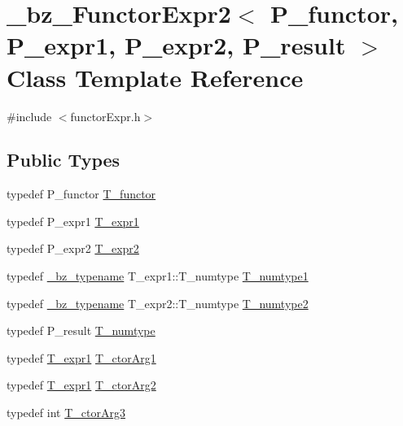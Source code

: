 \hypertarget{class__bz__FunctorExpr2}{}\section{\+\_\+bz\+\_\+\+Functor\+Expr2$<$ P\+\_\+functor, P\+\_\+expr1, P\+\_\+expr2, P\+\_\+result $>$ Class Template Reference}
\label{class__bz__FunctorExpr2}


{\ttfamily \#include $<$functor\+Expr.\+h$>$}

\subsection*{Public Types}
\begin{DoxyCompactItemize}
\item 
typedef P\+\_\+functor \hyperlink{class__bz__FunctorExpr2_a3fe23ec6c06a2346710d4590986bc1ae}{T\+\_\+functor}
\item 
typedef P\+\_\+expr1 \hyperlink{class__bz__FunctorExpr2_ab18a816b647c4ec928bdd1b61646abfd}{T\+\_\+expr1}
\item 
typedef P\+\_\+expr2 \hyperlink{class__bz__FunctorExpr2_af1371d32263c82261e4b24f3229af6ee}{T\+\_\+expr2}
\item 
typedef \hyperlink{compiler_8h_a1bc40add3e72effc9cf69dbe445cbdfd}{\+\_\+bz\+\_\+typename} T\+\_\+expr1\+::\+T\+\_\+numtype \hyperlink{class__bz__FunctorExpr2_ae7900fdd57163e00202ee2534db102f9}{T\+\_\+numtype1}
\item 
typedef \hyperlink{compiler_8h_a1bc40add3e72effc9cf69dbe445cbdfd}{\+\_\+bz\+\_\+typename} T\+\_\+expr2\+::\+T\+\_\+numtype \hyperlink{class__bz__FunctorExpr2_aa8c2406a5dba0757ad6c0de0c95ab026}{T\+\_\+numtype2}
\item 
typedef P\+\_\+result \hyperlink{class__bz__FunctorExpr2_a72c49dc29bb54d045667666e72ea96a6}{T\+\_\+numtype}
\item 
typedef \hyperlink{class__bz__FunctorExpr2_ab18a816b647c4ec928bdd1b61646abfd}{T\+\_\+expr1} \hyperlink{class__bz__FunctorExpr2_a6c13c1ebdee4d6a2a9e5d42a44d6af30}{T\+\_\+ctor\+Arg1}
\item 
typedef \hyperlink{class__bz__FunctorExpr2_ab18a816b647c4ec928bdd1b61646abfd}{T\+\_\+expr1} \hyperlink{class__bz__FunctorExpr2_aec9632e49bce5ab5259447ba414f4726}{T\+\_\+ctor\+Arg2}
\item 
typedef int \hyperlink{class__bz__FunctorExpr2_a6292f3b71ec0ff6e3bddc108ecea849c}{T\+\_\+ctor\+Arg3}
\end{DoxyCompactItemize}
